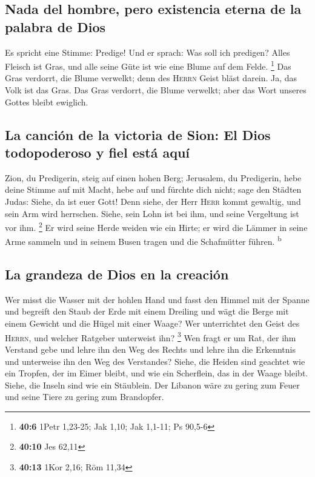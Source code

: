 \hypertarget{nada-del-hombre-pero-existencia-eterna-de-la-palabra-de-dios}{%
\subsection{Nada del hombre, pero existencia eterna de la palabra de
Dios}\label{nada-del-hombre-pero-existencia-eterna-de-la-palabra-de-dios}}

 Es spricht eine Stimme: Predige! Und er sprach: Was soll
ich predigen? Alles Fleisch ist Gras, und alle seine Güte ist wie eine
Blume auf dem Felde. \footnote{\textbf{40:6} 1Petr 1,23-25; Jak 1,10;
  Jak 1,1-11; Ps 90,5-6}  Das Gras verdorrt, die Blume
verwelkt; denn des \textsc{Herrn} Geist bläst darein. Ja, das Volk ist
das Gras.  Das Gras verdorrt, die Blume verwelkt; aber das
Wort unseres Gottes bleibt ewiglich.

\hypertarget{la-canciuxf3n-de-la-victoria-de-sion-el-dios-todopoderoso-y-fiel-estuxe1-aquuxed}{%
\subsection{La canción de la victoria de Sion: El Dios todopoderoso y
fiel está
aquí}\label{la-canciuxf3n-de-la-victoria-de-sion-el-dios-todopoderoso-y-fiel-estuxe1-aquuxed}}

 Zion, du Predigerin, steig auf einen hohen Berg;
Jerusalem, du Predigerin, hebe deine Stimme auf mit Macht, hebe auf und
fürchte dich nicht; sage den Städten Judas: Siehe, da ist euer Gott!
 Denn siehe, der Herr \textsc{Herr} kommt gewaltig, und
sein Arm wird herrschen. Siehe, sein Lohn ist bei ihm, und seine
Vergeltung ist vor ihm. \footnote{\textbf{40:10} Jes 62,11}
 Er wird seine Herde weiden wie ein Hirte; er wird die
Lämmer in seine Arme sammeln und in seinem Busen tragen und die
Schafmütter führen. \textsuperscript{b}

\hypertarget{la-grandeza-de-dios-en-la-creaciuxf3n}{%
\subsection{La grandeza de Dios en la
creación}\label{la-grandeza-de-dios-en-la-creaciuxf3n}}

 Wer misst die Wasser mit der hohlen Hand und fasst den
Himmel mit der Spanne und begreift den Staub der Erde mit einem Dreiling
und wägt die Berge mit einem Gewicht und die Hügel mit einer Waage?
 Wer unterrichtet den Geist des \textsc{Herrn}, und
welcher Ratgeber unterweist ihn? \footnote{\textbf{40:13} 1Kor 2,16; Röm
  11,34}  Wen fragt er um Rat, der ihm Verstand gebe und
lehre ihn den Weg des Rechts und lehre ihn die Erkenntnis und unterweise
ihn den Weg des Verstandes?  Siehe, die Heiden sind
geachtet wie ein Tropfen, der im Eimer bleibt, und wie ein Scherflein,
das in der Waage bleibt. Siehe, die Inseln sind wie ein Stäublein.
 Der Libanon wäre zu gering zum Feuer und seine Tiere zu
gering zum Brandopfer.


